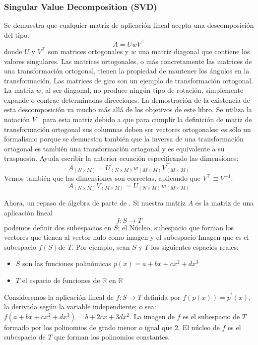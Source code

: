 \subsubsection{Singular Value Decomposition (SVD)}

Se demuestra que cualquier matriz de aplicación lineal acepta una
descomposición del tipo:\[ A=UwV^{\top}\] donde $U$ y $V^{\top}$ son
matrices ortogonales y $w$ una matriz diagonal que contiene los
valores singulares. Las matrices ortogonales, o más concretamente las
matrices de una transformación ortogonal, tienen la propiedad de
mantener los ángulos en la transformación.  Las matrices de giro son
un ejemplo de transformación ortogonal. La matriz $w$, al ser
diagonal, no produce ningún tipo de rotación, simplemente expande o
contrae determinadas direcciones. La demostración de la existencia de
esta descomposición va mucho más allá de los objetivos de este libro.
Se utiliza la notación $V^{\top}$ para esta matriz debido a que para
cumplir la definición de matiz de transformación ortogonal sus
columnas deben ser vectores ortogonales; es sólo un formalismo porque
se demuestra también que la inversa de una transformación ortogonal es
también una transformación ortogonal y es equivalente a su traspuesta.
Ayuda escribir la anterior ecuación especificando las dimensiones:
$$
A_{(N\times M)}=U_{(N\times M)}w_{(M\times M)}V_{(M\times M)}^{\top}$$
Vemos también que las dimensiones son correctas, aplicando que
$V^{\top}\equiv V^{-1}$:
$$ A_{(N\times M)}V_{(M\times M)}=U_{(N\times
  M)}w_{(M\times M)}$$


Ahora, un repaso de álgebra de parte de \cite{Algebra}. Si nuestra
matriz $A$ es la matriz de una aplicación lineal \[ f:S\longrightarrow
T\] podemos definir dos subespacios en $S$; el Núcleo, subespacio que
forman los vectores que tienen al vector nulo como imagen y el
subespacio Imagen que es el subespacio $f(S)$de $T$. Por ejemplo, sean
$S$ y $T$ los siguientes espacios reales:

\begin{itemize}
\item $S$ son las funciones polinómicas $p(x)=a+bx+cx^{2}+dx^{3}$
\item $T$ el espacio de funciones de $\mathbb{R}$ en $\mathbb{R}$
\end{itemize}
Consideremos la aplicación lineal de $f:S\longrightarrow T$ definida
por $f(p(x))=p^{\prime}(x)$, la derivada según la variable
independiente; o sea: $f(a+bx+cx^{2}+dx^{3})=b+2cx+3dx^{2}$. La imagen
de $f$ es el subespacio de $T$ formado por los polinomios de grado
menor o igual que 2. El núcleo de $f$ es el subespacio de $T$ que
forman los polinomios constantes.

